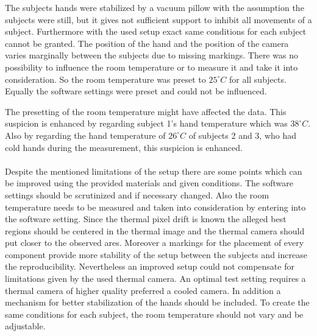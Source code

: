 The subjects hands were stabilized by a vacuum pillow with the assumption the subjects were still, but it gives not sufficient support to inhibit all movements of a subject. Furthermore with the used setup exact same conditions for each subject cannot be granted. The position of the hand and the position of the camera varies marginally between the subjects due to missing markings. There was no possibility to influence the room temperature or to measure it and take it into consideration. So the room temperature was preset to $25^\circ C$ for all subjects. Equally the software settings were preset and could not be influenced.

The presetting of the room temperature might have affected the data. This suspicion is enhanced by regarding subject 1's hand temperature which was $38^\circ C$. Also by regarding the hand temperature of $26^\circ C$ of subjects 2 and 3, who had cold hands during the measurement, this suspicion is enhanced. %
\\
\\
Despite the mentioned limitations of the setup there are some points which can be improved using the provided materials and given conditions. The software settings should be scrutinized and if necessary changed. Also the room temperature needs to be measured and taken into consideration by entering into the software setting. Since the thermal pixel drift is known the alleged best regions should be centered in the thermal image and the thermal camera should put closer to the observed ares.
Moreover a markings for the placement of every component provide more stability of the setup between the subjects and increase the reproducibility. Nevertheless an improved setup could not compensate for limitations given by the used thermal camera. An optimal test setting requires a thermal camera of higher quality preferred a cooled camera. In addition a mechanism for better stabilization of the hands should be included. To create the same conditions for each subject, the room temperature should not vary and be adjustable.